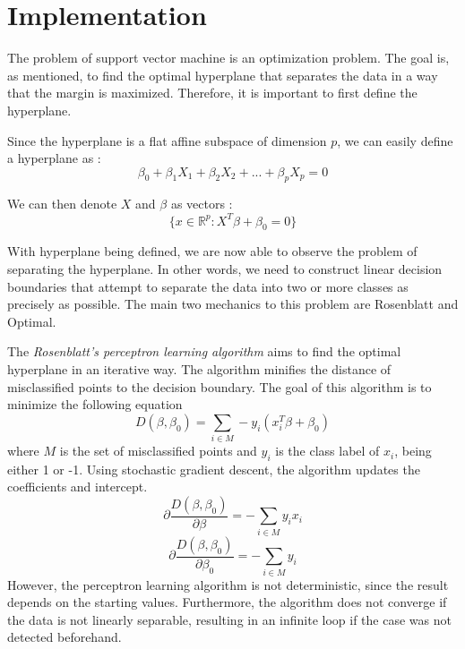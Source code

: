 \section{Implementation}
The problem of support vector machine is an optimization problem. The goal is, as mentioned, 
to find the optimal hyperplane that separates the data in a way that the margin is maximized.
Therefore, it is important to first define the hyperplane.

Since the hyperplane is a flat affine subspace of dimension $p$, we can easily define a hyperplane as \cite{R9}: 
\begin{equation}
    \beta_0 + \beta_1X_1 + \beta_2X_2 + ... + \beta_pX_p = 0
\end{equation}

We can then denote $X$ and $\beta$ as vectors \cite{Elements12}: 
\begin{equation}
    \{x \in \mathbb{R}^p: X^T \beta + \beta_0 = 0\}
\end{equation}

With hyperplane being defined, we are now able to observe the problem of separating the hyperplane. 
In other words, we need to construct linear decision
boundaries that attempt to separate the data into two or more classes as precisely as possible. 
The main two mechanics to this problem are Rosenblatt and Optimal.

The \emph{Rosenblatt's perceptron learning algorithm} aims to find the optimal hyperplane in an iterative way. The algorithm minifies
the distance of misclassified points to the decision boundary. The goal of this algorithm is to minimize the following equation
\begin{equation}
    D(\beta, \beta_0) = \sum_{i\in M} -y_i(x_i^T \beta + \beta_0)
\end{equation}
where $M$ is the set of misclassified points and $y_i$ is the class label of $x_i$, being either 1 or -1. Using stochastic gradient
descent, the algorithm updates the coefficients and intercept. 
\begin{equation}
    \partial\frac{D(\beta, \beta_0)}{\partial\beta} = -\sum_{i\in M} y_ix_i
\end{equation}
\begin{equation}
    \partial\frac{D(\beta, \beta_0)}{\partial\beta_0} = -\sum_{i\in M} y_i
\end{equation}
However, the perceptron learning algorithm is not deterministic, since
the result depends on the starting values. Furthermore, the algorithm does not converge if the data is not linearly separable, resulting
in an infinite loop if the case was not detected beforehand. \cite{Elements4}

